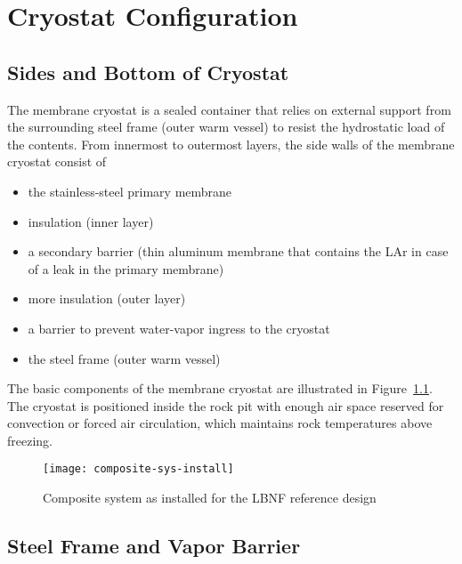 \chapter{Cryostat Configuration}
\label{Sec:cryo-cryosys-cryostat}

\section{Sides and Bottom of Cryostat}

The membrane cryostat is a sealed container that relies on external support 
from the surrounding steel frame (outer warm vessel) to resist the hydrostatic 
load of the contents. From innermost to outermost layers, the side 
walls of the membrane cryostat consist of 
\begin{itemize}
 \item{the stainless-steel primary membrane} 
 \item{insulation (inner layer)}
 \item{a secondary barrier (thin aluminum membrane that contains the 
       LAr in case of a leak in the primary membrane)}
 \item{more insulation (outer layer)}
 \item{a barrier to prevent water-vapor ingress to the cryostat}
 \item{the steel frame (outer warm vessel)}
\end{itemize}  
The basic components of the membrane cryostat are illustrated in
Figure~\ref{fig:composite-sys-install}. The cryostat is positioned
inside the rock pit with enough air space reserved for convection
or forced air circulation, which maintains rock temperatures above
freezing.

\begin{figure}[htbp]
\centering
\texttt{[image: composite-sys-install]}
\caption{Composite system as installed for the LBNF reference design} 
\label{fig:composite-sys-install}
\end{figure}


\section{Steel Frame and Vapor Barrier}

